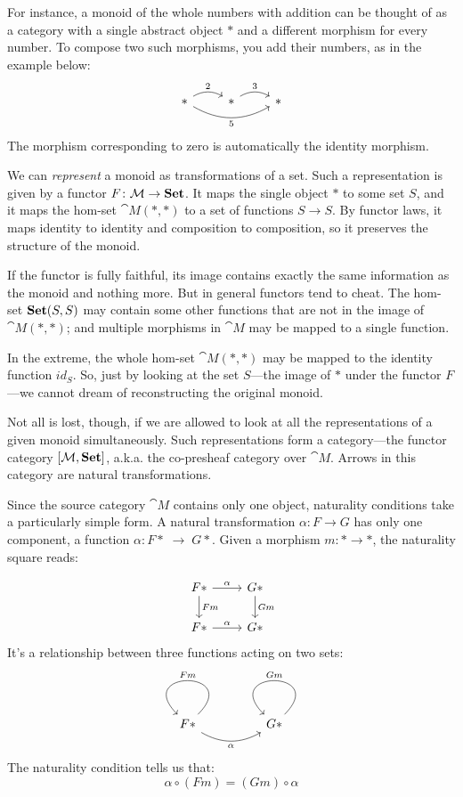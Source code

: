 \documentclass[DaoFP]{subfiles}
\begin{document}
For instance, a monoid of the whole numbers with addition can be thought of as a category with a single abstract object $*$ and a different morphism for every number. To compose two such morphisms, you add their numbers, as in the example below:
\[
 \begin{tikzcd}
  *
  \arrow[r, bend left, "2"]
  \arrow[rr, bend right, "5"']
 & *
 \arrow[r, bend left, "3"]
 & *
  \end{tikzcd}
\]
The morphism corresponding to zero is automatically the identity morphism. 

We can \emph{represent} a monoid as transformations of a set. Such a representation is given by a functor $F \colon \mathcal{M} \to \mathbf{Set}$. It maps the single object $*$ to some set $S$, and it maps the hom-set $\cat M(*, *)$ to a set of functions $S \to S$. By functor laws, it maps identity to identity and composition to composition, so it preserves the structure of the monoid. 

If the functor is fully faithful, its image contains exactly the same information as the monoid and nothing more. But in general functors tend to cheat. The hom-set $\mathbf{Set} (S, S)$ may contain some other functions that are not in the image of $\cat M(*, *)$; and multiple morphisms in $\cat M$ may be mapped to a single function. 

In the extreme, the whole hom-set $\cat M(*, *)$ may be mapped to the identity function $id_S$. So, just by looking at the set $S$---the image of $*$ under the functor $F$---we cannot dream of reconstructing the original monoid.

Not all is lost, though, if we are allowed to look at all the representations of a given monoid simultaneously. Such representations form a category---the functor category $[\mathcal{M}, \mathbf{Set}]$, a.k.a. the co-presheaf category over $\cat M$. Arrows in this category are natural transformations. 

Since the source category $\cat M$ contains only one object, naturality conditions take a particularly simple form. A natural transformation $\alpha \colon F \to G$ has only one component, a function $\alpha \colon F *\; \to \;G *$. Given a morphism $m \colon * \to *$, the naturality square reads:

\[
 \begin{tikzcd}
 F *
 \arrow[r, "\alpha"]
 \arrow[d, "F m"]
 & G *
  \arrow[d, "G m"]
\\
 F *
 \arrow[r, "\alpha"]
 & G *
 \end{tikzcd}
\]
It's a relationship between three functions acting on two sets:
\[
 \begin{tikzcd}
 F *
  \arrow[loop, "F m"']
  \arrow[rr, bend right, "\alpha"']
 && G *
  \arrow[loop, "G m"']
  \end{tikzcd}
\]
The naturality condition tells us that:
\[ \alpha \circ (F m) = (G m) \circ \alpha \]
\end{document}
